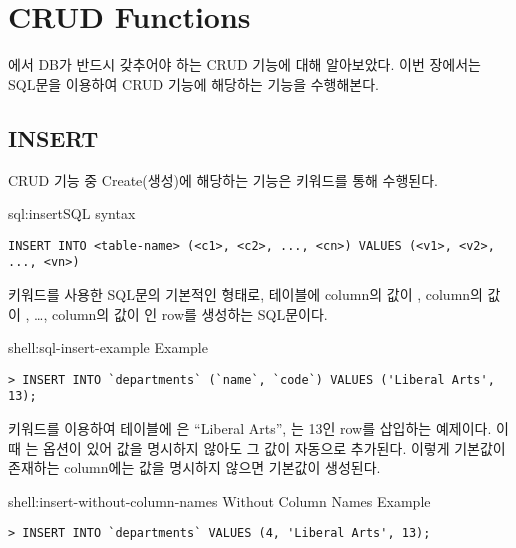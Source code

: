 \section{CRUD Functions}\label{sect:crud-functions}

에서 DB가 반드시 갖추어야 하는 CRUD 기능에 대해 알아보았다. 이번 장에서는 SQL문을 이용하여 CRUD 기능에 해당하는 기능을 수행해본다.

\subsection*{INSERT}

CRUD 기능 중 Create(생성)에 해당하는 기능은  키워드를 통해 수행된다.

\begin{sqlenv}{sql:insert}{SQL  syntax}\begin{verbatim}
INSERT INTO <table-name> (<c1>, <c2>, ..., <cn>) VALUES (<v1>, <v2>, ..., <vn>)
\end{verbatim}
\end{sqlenv}

\는  키워드를 사용한 SQL문의 기본적인 형태로,  테이블에  column의 값이 ,  column의 값이 , \ldots,  column의 값이 인 row를 생성하는 SQL문이다.

\begin{shellenv}{shell:sql-insert-example}{ Example}\begin{verbatim}
> INSERT INTO `departments` (`name`, `code`) VALUES ('Liberal Arts', 13);
\end{verbatim}
\end{shellenv}

\은  키워드를 이용하여  테이블에 은 ``Liberal Arts'', 는 13인 row를 삽입하는 예제이다. 이때 는  옵션이 있어 값을 명시하지 않아도 그 값이 자동으로 추가된다. 이렇게 기본값이 존재하는 column에는 값을 명시하지 않으면 기본값이 생성된다.

\begin{shellenv}{shell:insert-without-column-names}{ Without Column Names Example}\begin{verbatim}
> INSERT INTO `departments` VALUES (4, 'Liberal Arts', 13);
\end{verbatim}
\end{shellenv}

